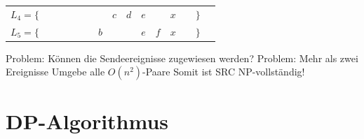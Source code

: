 \documentclass[ignorenonframetext]{beamer}
\begin{document}
\begin{frame}
\begin{center}
{\begin{tabular}{ccccccccccccccc}
			$L_4 = \{$&&&   &&&   & $c$ & $d$ & $e$ &&{$x$}&& $\}$\\
			$L_5 = \{$&&&   &&&$ b $  &   &   &$ e$ & $f$&{$x$}&& $\}$
		\end{tabular}}
	\end{center}

  \begin{overprint}
	\color{red}Problem: Können die Sendeereignisse  zugewiesen werden?
	\onslide<5>\color{red}Problem: Mehr als zwei Ereignisse
	\onslide<6>Umgebe alle $O(n^2)$-Paare
	\onslide<7>\color{orange}Somit ist SRC NP-vollständig!
  \end{overprint}
		
\end{frame}

\section{DP-Algorithmus}
\end{document}
